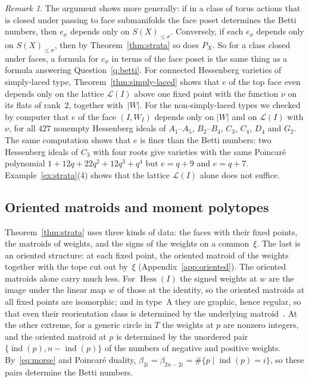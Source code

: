 \documentclass[11pt,a4paper]{article}
\numberwithin{equation}{section}
\theoremstyle{plain}
\theoremstyle{definition}
\theoremstyle{remark}
\newtheorem{remark}[theorem]{Remark}
\newcommand{\cL}{\mathcal{L}}
\DeclareMathOperator{\Hess}{Hess}
\DeclareMathOperator{\ind}{ind}
\begin{document}
\begin{remark}\label{rem:e-poset}
The argument shows more generally: if in a class of torus actions that is closed under passing to face submanifolds the face poset determines the Betti numbers, then $e_\sigma$ depends only on $S(X)_{\leqslant\sigma}$. Conversely, if each $e_\sigma$ depends only on $S(X)_{\leqslant\sigma}$, then by Theorem~\ref{thm:strata} so does $P_X$. So for a class closed under faces, a formula for $e_\sigma$ in terms of the face poset is the same thing as a formula answering Question~\ref{q:betti}. For connected Hessenberg varieties of simply-laced type, Theorem~\ref{thm:simply-laced} shows that $e$ of the top face even depends only on the lattice $\cL(I)$ above one fixed point with the function $\nu$ on its flats of rank~$2$, together with~$|W|$. For the non-simply-laced types we checked by computer that $e$ of the face $(I,W_I)$ depends only on $|W|$ and on $\cL(I)$ with $\nu$, for all $427$ nonempty Hessenberg ideals of $A_1$--$A_5$, $B_2$--$B_4$, $C_3$, $C_4$, $D_4$ and $G_2$. The same computation shows that $e$ is finer than the Betti numbers: two Hessenberg ideals of $C_3$ with four roots give varieties with the same Poincaré polynomial $1+12q+22q^2+12q^3+q^4$ but $e=q+9$ and $e=q+7$. Example~\ref{ex:strata}(4) shows that the lattice $\cL(I)$ alone does not suffice.
\end{remark}

\subsection{Oriented matroids and moment polytopes}
Theorem~\ref{thm:strata} uses three kinds of data: the faces with their fixed points, the matroids of weights, and the signs of the weights on a common~$\xi$. The last is an oriented structure: at each fixed point, the oriented matroid of the weights together with the tope cut out by~$\xi$ (Appendix~\ref{app:oriented}). The oriented matroids alone carry much less. For $\Hess(I)$ the signed weights at $w$ are the image under the linear map $w$ of those at the identity, so the oriented matroids at all fixed points are isomorphic; and in type~A they are graphic, hence regular, so that even their reorientation class is determined by the underlying matroid~\cite{BLV78}. At the other extreme, for a generic circle in $T$ the weights at $p$ are nonzero integers, and the oriented matroid at $p$ is determined by the unordered pair $\{\ind(p),n-\ind(p)\}$ of the numbers of negative and positive weights. By~\eqref{eq:morse} and Poincaré duality, $\beta_{2i}=\beta_{2n-2i}=\#\{p\mid\ind(p)=i\}$, so these pairs determine the Betti numbers.
\end{document}
